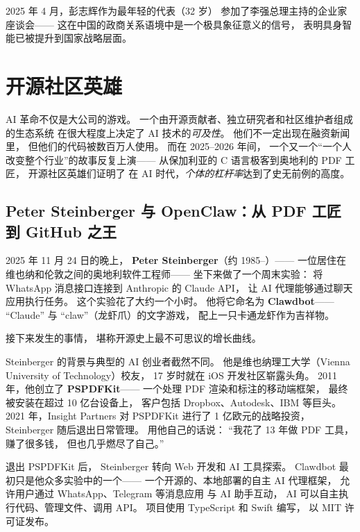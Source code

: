 2025 年 4 月，彭志辉作为最年轻的代表（32 岁）
参加了李强总理主持的企业家座谈会——
这在中国的政商关系语境中是一个极具象征意义的信号，
表明具身智能已被提升到国家战略层面。

\section{开源社区英雄}
\label{sec:opensource}

AI 革命不仅是大公司的游戏。
一个由开源贡献者、独立研究者和社区维护者组成的生态系统
在很大程度上决定了 AI 技术的\emph{可及性}。
他们不一定出现在融资新闻里，
但他们的代码被数百万人使用。
而在 2025--2026 年间，
一个又一个``一个人改变整个行业''的故事反复上演——
从保加利亚的 C 语言极客到奥地利的 PDF 工匠，
开源社区英雄们证明了
在 AI 时代，\emph{个体的杠杆率}达到了史无前例的高度。

\subsection{Peter Steinberger 与 OpenClaw：从 PDF 工匠到 GitHub 之王}

2025 年 11 月 24 日的晚上，
\textbf{Peter Steinberger}（约 1985--）——
一位居住在维也纳和伦敦之间的奥地利软件工程师——
坐下来做了一个周末实验：
将 WhatsApp 消息接口连接到 Anthropic 的 Claude API，
让 AI 代理能够通过聊天应用执行任务。
这个实验花了大约一个小时。
他将它命名为 \textbf{Clawdbot}——
``Claude'' 与 ``claw''（龙虾爪）的文字游戏，
配上一只卡通龙虾作为吉祥物。

接下来发生的事情，
堪称开源史上最不可思议的增长曲线。

Steinberger 的背景与典型的 AI 创业者截然不同。
他是维也纳理工大学（Vienna University of Technology）校友，
17 岁时就在 iOS 开发社区崭露头角。
2011 年，他创立了 \textbf{PSPDFKit}——
一个处理 PDF 渲染和标注的移动端框架，
最终被安装在超过 10 亿台设备上，
客户包括 Dropbox、Autodesk、IBM 等巨头。
2021 年，Insight Partners 对 PSPDFKit 进行了
1 亿欧元的战略投资，
Steinberger 随后退出日常管理。
用他自己的话说：
``我花了 13 年做 PDF 工具，
赚了很多钱，
但也几乎燃尽了自己。''

退出 PSPDFKit 后，
Steinberger 转向 Web 开发和 AI 工具探索。
Clawdbot 最初只是他众多实验中的一个——
一个开源的、本地部署的自主 AI 代理框架，
允许用户通过 WhatsApp、Telegram 等消息应用
与 AI 助手互动，
AI 可以自主执行代码、管理文件、调用 API。
项目使用 TypeScript 和 Swift 编写，
以 MIT 许可证发布。

